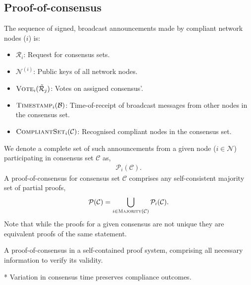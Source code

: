 \subsection{Proof-of-consensus} \label{sec:PoC}

The sequence of signed, broadcast announcements made by compliant network nodes ($i$) is:
\begin{itemize}
	\item $\mathcal{R}_i$: Request for consensus sets.
	\item $\mathcal{N}^{(i)}$: Public keys of all network nodes.
	\item $\textsc{Vote}_i(\tilde{\mathcal{R}}_j)$: Votes on assigned consensus'.
	\item $\textsc{Timestamp}_i(\mathcal{B})$: Time-of-receipt of broadcast messages from other nodes in the consensus set.
	\item $\textsc{CompliantSet}_i(\mathcal{C})$: Recognised compliant nodes in the consensus set.
\end{itemize}
We denote a complete set of such announcements from a given node ($i\in\mathcal{N}$) participating in consensus set $\mathcal{C}$ as,
\begin{align}
	\mathcal{P}_i(\mathcal{C}).
\end{align}
A proof-of-consensus for consensus set $\mathcal{C}$ comprises any self-consistent majority set of partial proofs,
\begin{align}
	\mathcal{P}(\mathcal{C}) = \bigcup_{i\in\textsc{Majority}(\mathcal{C})} \mathcal{P}_i(\mathcal{C}).
\end{align}
Note that while the proofs for a given consensus are not unique they are equivalent proofs of the same statement.

A proof-of-consensus in a self-contained proof system, comprising all necessary information to verify its validity.

* Variation in consensus time preserves compliance outcomes.

